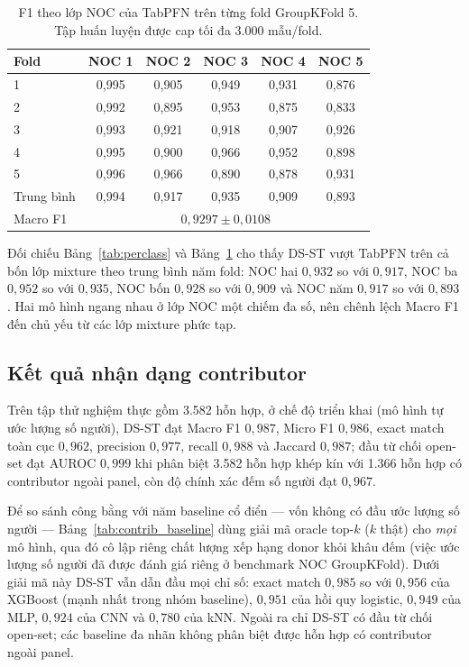\documentclass[12pt,a4paper]{article}
\begin{document}
\begin{table}[H]
\centering
\caption{F1 theo lớp NOC của TabPFN trên từng fold GroupKFold 5. Tập huấn luyện được cap tối đa 3.000 mẫu/fold.}
\label{tab:perclass_tabpfn}
\small
\begin{tabular}{lccccc}
\toprule
\textbf{Fold} & \textbf{NOC 1} & \textbf{NOC 2} & \textbf{NOC 3} & \textbf{NOC 4} & \textbf{NOC 5} \\
\midrule
1 & 0,995 & 0,905 & 0,949 & 0,931 & 0,876 \\
2 & 0,992 & 0,895 & 0,953 & 0,875 & 0,833 \\
3 & 0,993 & 0,921 & 0,918 & 0,907 & 0,926 \\
4 & 0,995 & 0,900 & 0,966 & 0,952 & 0,898 \\
5 & 0,996 & 0,966 & 0,890 & 0,878 & 0,931 \\
\midrule
Trung bình & 0,994 & 0,917 & 0,935 & 0,909 & 0,893 \\
\midrule
Macro F1 & \multicolumn{5}{c}{$0{,}9297\pm0{,}0108$} \\
\bottomrule
\end{tabular}
\end{table}

Đối chiếu Bảng~\ref{tab:perclass} và Bảng~\ref{tab:perclass_tabpfn} cho thấy DS-ST vượt TabPFN trên cả bốn lớp mixture theo trung bình năm fold: NOC hai \(0,932\) so với \(0,917\), NOC ba \(0,952\) so với \(0,935\), NOC bốn \(0,928\) so với \(0,909\) và NOC năm \(0,917\) so với \(0,893\). Hai mô hình ngang nhau ở lớp NOC một chiếm đa số, nên chênh lệch Macro F1 đến chủ yếu từ các lớp mixture phức tạp.

\subsection{Kết quả nhận dạng contributor}

Trên tập thử nghiệm thực gồm 3.582 hỗn hợp, ở chế độ triển khai (mô hình tự ước lượng số người), DS-ST đạt Macro F1 \(0,987\), Micro F1 \(0,986\), exact match toàn cục \(0,962\), precision \(0,977\), recall \(0,988\) và Jaccard \(0,987\); đầu từ chối open-set đạt AUROC \(0,999\) khi phân biệt 3.582 hỗn hợp khép kín với 1.366 hỗn hợp có contributor ngoài panel, còn độ chính xác đếm số người đạt \(0,967\).

Để so sánh công bằng với năm baseline cổ điển — vốn không có đầu ước lượng số người — Bảng~\ref{tab:contrib_baseline} dùng giải mã oracle top-\(k\) (\(k\) thật) cho \emph{mọi} mô hình, qua đó cô lập riêng chất lượng xếp hạng donor khỏi khâu đếm (việc ước lượng số người đã được đánh giá riêng ở benchmark NOC GroupKFold). Dưới giải mã này DS-ST vẫn dẫn đầu mọi chỉ số: exact match \(0,985\) so với \(0,956\) của XGBoost (mạnh nhất trong nhóm baseline), \(0,951\) của hồi quy logistic, \(0,949\) của MLP, \(0,924\) của CNN và \(0,780\) của kNN. Ngoài ra chỉ DS-ST có đầu từ chối open-set; các baseline đa nhãn không phân biệt được hỗn hợp có contributor ngoài panel.
\end{document}

